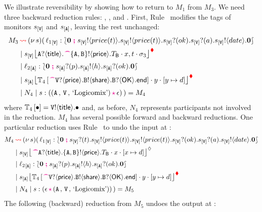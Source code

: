 \documentclass[runningheads,plain]{llncs}
\begin{document}
We illustrate  reversibility by showing how to return to $M_1$ from $M_3$.
We need  three backward reduction rules: , , and .
First, Rule~ modifies the tags of monitors $\ep{s}{\pS}$ and $\ep{s}{\pA}$,
  leaving the rest unchanged:
\begin{align*}
M_3 & \bk  \news{s}(\,  
\np{\key{{\loc_1}}{\pS}}{ \conf{\inact}{\bout{\epS}{price(t)}\bout{\epS}{price(t)}\binp{\epS}{ok}  \binp{\epS}{a} \bout{\epS}{date}\inact }} 
\\
& \Par 
 \monir{\ep{s}{\pS}}{\ltinp{A}{\mathsf{title}}{\past \ltout{\{A,B\}}{\mathsf{price}}{T_\mathsf{B}}}}{x,t}{\store_3} 
\\
& \Par \np{\key{{\loc_2}}{\pA}}{ \conf{\inact}{\binp{\epA}{p}\bout{\epA}{h}\binp{\epA}{ok}\inact}} 
\\
& \Par 
\monir{\ep{s}{\pA}}{\myctxr{\ctx{T}_4}{\past \ltinp{\pS}{\mathsf{price}}{\ltout{B}{\mathsf{share}}{\ltinp{B}{\mathsf{OK}}{\lend}}}}}{y}{\upd{y}{d}} 
\\
& \Par N_4 \Par \codah{s}{\valueq{\pA}{\pS}{\exBook}}{\emp}{}~)  = M_4
\end{align*}
where
$\myctxr{\ctx{T}_4}{\bullet}  =\ltout{\pS}{\mathsf{title}}{\bullet}$ and, as before, $N_4$ represents participants not involved in the reduction.
$M_4$ has several possible forward and backward reductions. 
One particular reduction uses Rule~
to undo the input at \pS:
\begin{align*}
M_4 & \bk  \news{s}(\,  
\np{\key{{\loc_1}}{\pS}}{ \conf{\inact}{\binp{\epS}{t}\bout{\epS}{price(t)}\bout{\epS}{price(t)}   \binp{\epS}{ok}\binp{\epS}{a} \bout{\epS}{date}\inact }} 
\\
& \Par 
 \hmoni{\ep{s}{\pS}}{\past \ltinp{A}{\mathsf{title}}{\ltout{\{A,B\}}{\mathsf{price}}{T_\mathsf{B}}}}{x}{\upd{x}{d}} 
\\
& \Par \np{\key{{\loc_2}}{\pA}}{ \conf{\inact}{\binp{\epA}{p}\bout{\epA}{h}\binp{\epA}{ok}\inact}} 
\\
& \Par 
\monir{\ep{s}{\pA}}{\myctxr{\ctx{T}_4}{\past \ltinp{\pS}{\mathsf{price}}{\ltout{B}{\mathsf{share}}{\ltinp{B}{\mathsf{OK}}{\lend}}}}}{y}{\upd{y}{d}} 
\\
& \Par N_4 \Par \codah{s}{\emp}{\valueq{\pA}{\pS}{\exBook}}{}~)  = M_5
\end{align*}
The following (backward) reduction from $M_5$ undoes the output at \pA:
\end{document}
